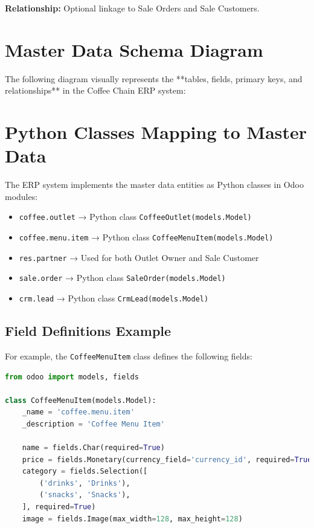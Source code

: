 \noindent
\textbf{Relationship:} Optional linkage to Sale Orders and Sale Customers.

\section*{Master Data Schema Diagram}
The following diagram visually represents the **tables, fields, primary keys, and relationships** in the Coffee Chain ERP system:


\section*{Python Classes Mapping to Master Data}
The ERP system implements the master data entities as Python classes in Odoo modules:

\begin{itemize}
    \item \texttt{coffee.outlet} → Python class \texttt{CoffeeOutlet(models.Model)}
    \item \texttt{coffee.menu.item} → Python class \texttt{CoffeeMenuItem(models.Model)}
    \item \texttt{res.partner} → Used for both Outlet Owner and Sale Customer
    \item \texttt{sale.order} → Python class \texttt{SaleOrder(models.Model)}
    \item \texttt{crm.lead} → Python class \texttt{CrmLead(models.Model)}
\end{itemize}

\subsection*{Field Definitions Example}
For example, the \texttt{CoffeeMenuItem} class defines the following fields:

\begin{lstlisting}[language=Python, caption={Coffee Menu Item Python Class}]
from odoo import models, fields

class CoffeeMenuItem(models.Model):
    _name = 'coffee.menu.item'
    _description = 'Coffee Menu Item'

    name = fields.Char(required=True)
    price = fields.Monetary(currency_field='currency_id', required=True)
    category = fields.Selection([
        ('drinks', 'Drinks'),
        ('snacks', 'Snacks'),
    ], required=True)
    image = fields.Image(max_width=128, max_height=128)
\end{lstlisting}

